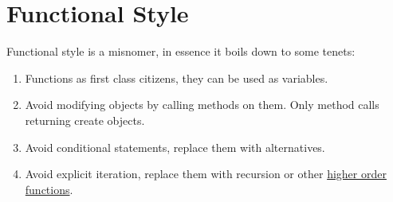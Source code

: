 \chapter{Functional Style}\label{functional-style}

{\LARGE F}unctional style is a misnomer, in essence it boils down to some tenets:
\begin{enumerate}
\item{ Functions as first class citizens, they can be used as variables. }
\item{ Avoid modifying objects by calling methods on them. Only method calls returning create objects. }
\item{ Avoid conditional statements, replace them with alternatives. }
\item{ Avoid explicit iteration, replace them with recursion or other 
\href{https://en.wikipedia.org/wiki/Higher-order_function}{higher order functions}. }
\end{enumerate}


